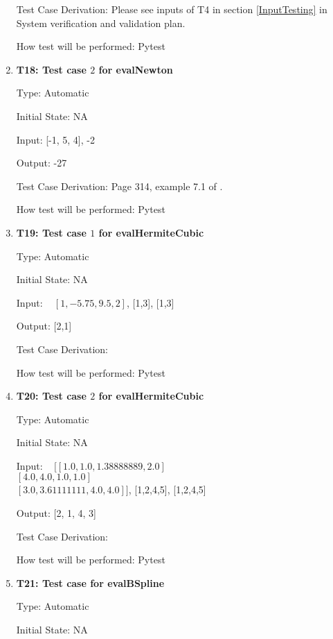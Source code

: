 \documentclass[12pt, titlepage]{article}
\begin{document}
\begin{enumerate}
Test Case Derivation: Please see inputs of T4 in section \ref{InputTesting} in 
System verification and validation plan. 

How test will be performed: Pytest

\item{\textbf{T18: Test case $2$ for evalNewton}}

Type: Automatic

Initial State: NA 

Input: [-1, 5, 4], -2 

Output: -27

Test Case Derivation: Page 314, example 7.1 of \cite{Health1997}. 

How test will be performed: Pytest



\item{\textbf{T19: Test case $1$ for evalHermiteCubic}}

Type: Automatic

Initial State: NA 

Input: ~\newline 
$[1,-5.75, 9.5, 2]$, [1,3], [1,3]						

Output: [2,1]

Test Case Derivation: \cite{HermiteCubic2}

How test will be performed: Pytest

\item{\textbf{T20: Test case $2$ for evalHermiteCubic}}

Type: Automatic

Initial State: NA 

Input: ~\newline 
$[[1.0,1.0, 1.38888889, 2.0]$\\
$[4.0, 4.0, 1.0, 1.0]$\\
$[3.0, 3.61111111, 4.0, 4.0]]$, [1,2,4,5], [1,2,4,5]					

Output: [2, 1, 4, 3]

Test Case Derivation: \cite{HermiteCubic2}

How test will be performed: Pytest

\item{\textbf{T21: Test case for evalBSpline}}

Type: Automatic

Initial State: NA 


\end{enumerate}
\end{document}
